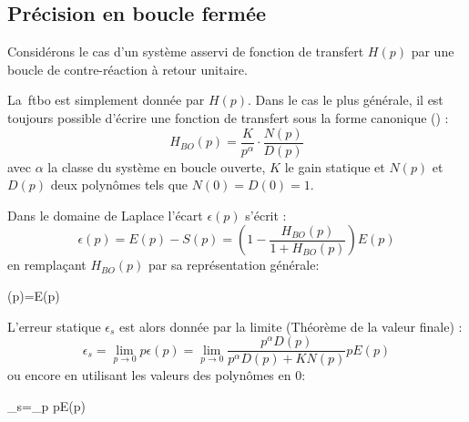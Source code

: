 \subsection{Précision en boucle fermée}

Considérons le cas d'un système asservi de fonction de transfert $H(p)$
par une boucle de contre-réaction à retour unitaire.

\begin{center}
\end{center}

La~\gls{ftbo} est simplement donnée par $H(p)$. Dans le cas le plus
générale, il est toujours possible d'écrire une fonction de transfert
sous la forme canonique () :
$$
H_{BO}(p)=\dfrac{K}{p^\alpha}\cdot\dfrac{N(p)}{D(p)}
$$
avec $\alpha$ la classe du système en boucle ouverte, $K$ le gain statique et 
$N(p)$ et $D(p)$ deux polynômes tels que $N(0)=D(0)=1$. 


Dans le domaine de Laplace l'écart $\epsilon(p)$ s'écrit :
$$
\epsilon(p)=E(p)-S(p)=\left(1-\dfrac{H_{BO}(p)}{1+H_{BO}(p)}\right)E(p)
$$
en remplaçant $H_{BO}(p)$ par sa représentation générale:
\begin{bequation}
\epsilon(p)=E(p)
\end{bequation}

L'erreur statique $\epsilon_s$ est alors donnée par la limite (Théorème 
de la valeur finale) :
$$
\epsilon_s=\lim\limits_{p\to 0} p\epsilon(p)=\lim\limits_{p\to 0} 
           \dfrac{p^\alpha D(p)}{p^\alpha D(p)+KN(p)}pE(p) 
$$
ou encore en utilisant les valeurs des polynômes en 0: 
\begin{bequation}
	\epsilon_s=\lim\limits_{p} pE(p)
	\label{eq-erreurStatique}
\end{bequation}

